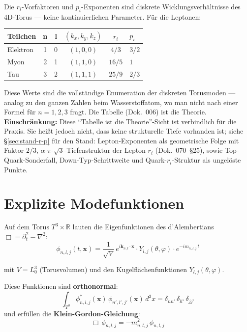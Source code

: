 Die $r_i$-Vorfaktoren und $p_i$-Exponenten sind diskrete Wicklungsverhältnisse
des 4D-Torus — keine kontinuierlichen Parameter. Für die Leptonen:

\begin{center}
{\footnotesize
\begin{tabular}{lccccl}
\toprule
\textbf{Teilchen} & \textbf{n} & \textbf{l} &
  \textbf{$(k_x,k_y,k_z)$} & \textbf{$r_i$} & \textbf{$p_i$} \\
\midrule
Elektron & 1 & 0 & $(1,0,0)$ & $4/3$ & $3/2$ \\
Myon     & 2 & 1 & $(1,1,0)$ & $16/5$ & $1$ \\
Tau      & 3 & 2 & $(1,1,1)$ & $25/9$ & $2/3$ \\
\bottomrule
\end{tabular}
}
\end{center}

Diese Werte sind die vollständige Enumeration der diskreten Torusmoden —
analog zu den ganzen Zahlen beim Wasserstoffatom, wo man nicht nach einer
Formel für $n=1,2,3$ fragt. Die Tabelle (Dok.~006) ist die Theorie.
\textbf{Einschränkung:} Diese \enquote{Tabelle ist die Theorie}-Sicht
ist verbindlich für die Praxis. Sie heißt jedoch nicht, dass keine
strukturelle Tiefe vorhanden ist; siehe §\ref{sec:stand-r-p} für
den Stand: Lepton-Exponenten als geometrische Folge mit Faktor $2/3$,
$\alpha$-$\pi$-$\sqrt{3}$-Tiefenstruktur der Lepton-$r_i$ (Dok.~070~§25),
sowie Top-Quark-Sonderfall, Down-Typ-Schrittweite und Quark-$r_i$-Struktur
als ungelöste Punkte.

\section{Explizite Modefunktionen}

Auf dem Torus $T^3 \times \mathbb{R}$ lauten die Eigenfunktionen des
d'Alembertians $\Box = \partial_t^2 - \nabla^2$:
\begin{equation}
  \boxed{
    \phi_{n,l,j}(t,\mathbf{x})
    = \frac{1}{\sqrt{V}}\,
      e^{i\mathbf{k}_{n,l}\cdot\mathbf{x}} \cdot
      Y_{l,j}(\theta,\varphi) \cdot
      e^{-im_{n,l,j}\,t}
  }
\end{equation}

mit $V = L_0^3$ (Torusvolumen) und den Kugelflächenfunktionen
$Y_{l,j}(\theta,\varphi)$.

Diese Funktionen sind \textbf{orthonormal}:
\begin{equation}
  \int_{T^3} \phi_{n,l,j}^*(\mathbf{x})\,\phi_{n',l',j'}(\mathbf{x})\,d^3x
  = \delta_{nn'}\,\delta_{ll'}\,\delta_{jj'}
\end{equation}
und erfüllen die \textbf{Klein-Gordon-Gleichung}:
\begin{equation}
  \Box\,\phi_{n,l,j} = -m_{n,l,j}^2\,\phi_{n,l,j}
\end{equation}

